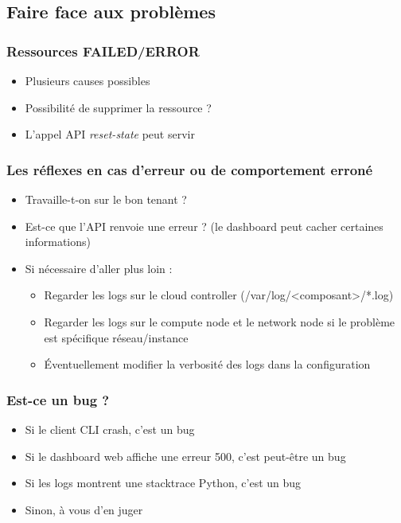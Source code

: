   \subsection[Problèmes]{Faire face aux problèmes}

  \begin{frame}
    \frametitle{Ressources FAILED/ERROR}
    \begin{itemize}
      \item Plusieurs causes possibles
      \item Possibilité de supprimer la ressource ?
      \item L'appel API \textit{reset-state} peut servir
    \end{itemize}
  \end{frame}

  \begin{frame}
    \frametitle{Les réflexes en cas d'erreur ou de comportement erroné}
    \begin{itemize}
      \item Travaille-t-on sur le bon tenant ?
      \item Est-ce que l'API renvoie une erreur ? (le dashboard peut cacher certaines informations)
      \item Si nécessaire d'aller plus loin :
        \begin{itemize}
          \item Regarder les logs sur le cloud controller (/var/log/\textless composant\textgreater/*.log)
          \item Regarder les logs sur le compute node et le network node si le problème est spécifique réseau/instance
          \item Éventuellement modifier la verbosité des logs dans la configuration
        \end{itemize}
    \end{itemize}
  \end{frame}

  \begin{frame}
    \frametitle{Est-ce un bug ?}
    \begin{itemize}
      \item Si le client CLI crash, c'est un bug\pause
      \item Si le dashboard web affiche une erreur 500, c'est peut-être un bug\pause
      \item Si les logs montrent une stacktrace Python, c'est un bug\pause
      \item Sinon, à vous d'en juger
    \end{itemize}
  \end{frame}
